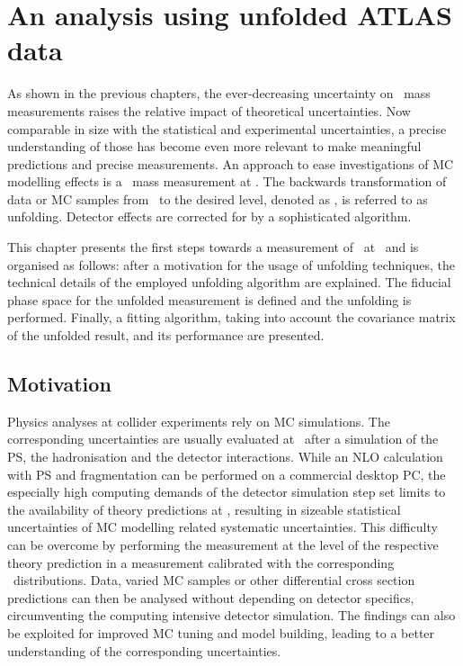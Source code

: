 \chapter{An analysis using unfolded ATLAS data}
\label{chap:unfolding}
%
As shown in the previous chapters, the ever-decreasing uncertainty on \tquark\ mass measurements raises the relative impact of theoretical uncertainties. Now comparable in size with the statistical and experimental uncertainties, a precise understanding of those has become even more relevant to make meaningful predictions and precise measurements.
%
An approach to ease investigations of \gls{MC} modelling effects is a \tquark\ mass measurement at \stablevel. 
%
The backwards transformation of data or \gls{MC} samples from \recolevel\ to the desired level, denoted as \truelevel, is referred to as unfolding. Detector effects are corrected for by a sophisticated algorithm.


This chapter presents the first steps towards a measurement of \mt\ at \stablevel\ and is organised as follows: after a motivation for the usage of unfolding techniques, the technical details of the employed unfolding algorithm are explained. The fiducial phase space for the unfolded measurement is defined and the unfolding is performed. Finally, a fitting algorithm, taking into account the covariance matrix of the unfolded result, and its performance are presented.











\section{Motivation}
%
%
Physics analyses at collider experiments rely on \gls{MC} simulations. The corresponding uncertainties are usually evaluated at \recolevel\ after a simulation of the \gls{PS}, the hadronisation and the detector interactions. 
While an \gls{NLO} calculation with \gls{PS} and fragmentation can be performed on a commercial desktop \gls{PC}, the especially high computing demands of the detector simulation step set limits to the availability of theory predictions at \recolevel, resulting in sizeable statistical uncertainties of \gls{MC} modelling related systematic uncertainties.
This difficulty can be overcome by performing the measurement at the level of the respective theory prediction in a measurement calibrated with the corresponding \truelevel\ distributions.
%
Data, varied \gls{MC} samples or other differential cross section predictions can then be analysed without depending on detector specifics, circumventing the computing intensive detector simulation. 
%
The findings can also be exploited for improved \gls{MC} tuning and model building, leading to a better understanding of the corresponding uncertainties. 



